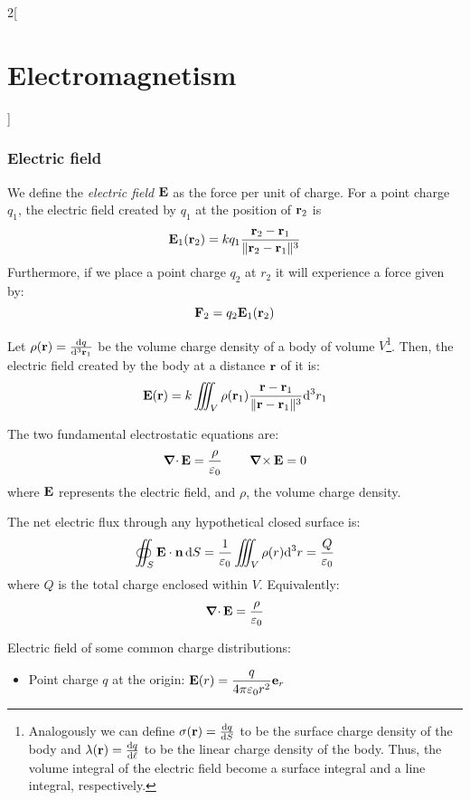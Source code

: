 \documentclass[../../../main_physics.tex]{subfiles}
\begin{document}
\begin{multicols}{2}[\section{Electromagnetism}]
  \subsubsection{Electric field}
  \begin{proposition}
    We define the \emph{electric field} $\boldsymbol{\mathrm{E}}$ as the force per unit of charge. For a point charge $q_1$, the electric field created by $q_1$ at the position of $\boldsymbol{\mathrm{r}}_2$ is $$\boldsymbol{\mathrm{E}}_1(\boldsymbol{\mathrm{r}}_2)=kq_1\frac{\boldsymbol{\mathrm{r}}_2-\boldsymbol{\mathrm{r}}_1}{\|\boldsymbol{\mathrm{r}}_2-\boldsymbol{\mathrm{r}}_1\|^3}$$ Furthermore, if we place a point charge $q_2$ at $r_2$ it will experience a force given by: $$\boldsymbol{\mathrm{F}}_2=q_2\boldsymbol{\mathrm{E}}_1(\boldsymbol{\mathrm{r}}_2)$$
  \end{proposition}
  \begin{proposition}
    Let $\rho(\boldsymbol{\mathrm{r}})=\dv{q}{^3\boldsymbol{\mathrm{r}}_1}$ be the volume charge density of a body of volume $V$\footnote{Analogously we can define $\sigma(\boldsymbol{\mathrm{r}})=\dv{q}{S}$ to be the surface charge density of the body and $\lambda(\boldsymbol{\mathrm{r}})=\dv{q}{\ell}$ to be the linear charge density of the body. Thus, the volume integral of the electric field become a surface integral and a line integral, respectively.}. Then, the electric field created by the body at a distance $\boldsymbol{\mathrm{r}}$ of it is: $$\boldsymbol{\mathrm{E}}(\boldsymbol{\mathrm{r}})=k\iiint_V\rho(\boldsymbol{\mathrm{r}}_1)\frac{\boldsymbol{\mathrm{r}}-\boldsymbol{\mathrm{r}}_1}{\|\boldsymbol{\mathrm{r}}-\boldsymbol{\mathrm{r}}_1\|^3}\dd^3{r_1}$$
  \end{proposition}
  \begin{theorem}
    The two fundamental electrostatic equations are:
    $$\operatorname{\boldsymbol{\mathrm{\nabla}}\cdot}\boldsymbol{\mathrm{E}}=\frac{\rho}{\varepsilon_0}\qquad\operatorname{\boldsymbol{\mathrm{\nabla}}\times}\boldsymbol{\mathrm{E}}=0$$
    where $\boldsymbol{\mathrm{E}}$ represents the electric field, and $\rho$, the volume charge density.
  \end{theorem}
  \begin{theorem}
    The net electric flux through any hypothetical closed surface is:
    $$
      \oiint_S\boldsymbol{\mathrm{E}}\cdot\boldsymbol{\mathrm{n}}\dd{S}=\frac{1}{\varepsilon_0}\iiint_V\rho(r)\dd^3 r=\frac{Q}{\varepsilon_0}
    $$
    where $Q$ is the total charge enclosed within $V$. Equivalently:
    \begin{equation}
      \operatorname{\boldsymbol{\mathrm{\nabla}}\cdot}\boldsymbol{\mathrm{E}}=\frac{\rho}{\varepsilon_0}
      \label{E_gauss}
    \end{equation}
  \end{theorem}
  \begin{proposition}
    Electric field of some common charge distributions:
    \begin{itemize}
      \item Point charge $q$ at the origin: $\displaystyle \boldsymbol{\mathrm{E}}(r)=\frac{q}{4\pi\varepsilon_0 r^2}\boldsymbol{\mathrm{e}}_r$

\end{itemize}
\end{proposition}
\end{multicols}
\end{document}
